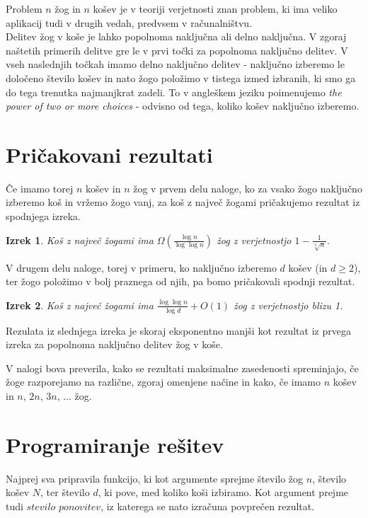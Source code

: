 \documentclass[a4paper, 11pt]{article}
\newtheorem{Izrek}{Izrek}
\begin{document}
Problem $n$ žog in $n$ košev je v teoriji verjetnosti znan problem, ki ima veliko aplikacij tudi v drugih vedah, predvsem v računalništvu.\\
Delitev žog v koše je lahko popolnoma naključna ali delno naključna.
V zgoraj naštetih primerih delitve gre le v prvi točki za popolnoma naključno delitev.
V vseh naslednjih točkah imamo delno naključno delitev - naključno izberemo le določeno število košev in nato žogo položimo v tistega izmed izbranih,
ki smo ga do tega trenutka najmanjkrat zadeli. To v angleškem jeziku poimenujemo \emph{the power of
two or more choices} - odvisno od tega, koliko košev naključno izberemo.

\section{Pričakovani rezultati}

Če imamo torej $n$ košev in $n$ žog v prvem delu naloge, ko za vsako žogo naključno izberemo koš in vržemo žogo vanj,
za koš z največ žogami pričakujemo rezultat iz spodnjega izreka.

\begin{Izrek}
    Koš z največ žogami ima $\Omega (\frac{\log{n}}{\log{\log{n}}})$ žog z verjetnostjo $1 - \frac{1}{\sqrt[3]{n}}$.
\end{Izrek}

V drugem delu naloge, torej v primeru, ko naključno izberemo $d$ košev (in $d \geq 2$), ter žogo položimo v bolj praznega od njih,
pa bomo pričakovali spodnji rezultat.

\begin{Izrek}
    Koš z največ žogami ima $\frac{\log {\log{n}}}{\log{d}} + O(1)$ žog z verjetnostjo blizu 1.
\end{Izrek}

Rezulata iz slednjega izreka je skoraj eksponentno manjši kot rezultat iz prvega izreka za popolnoma naključno delitev žog v koše.

V nalogi bova preverila, kako se rezultati maksimalne zasedenosti spreminjajo, če žoge razporejamo na različne, zgoraj omenjene načine
in kako, če imamo $n$ košev in $n$, $2n$, $3n$, ... žog.


\section{Programiranje rešitev}

Najprej sva pripravila funkcijo, ki kot argumente sprejme
število žog $n$, število košev $N$, ter število $d$, ki pove,
med koliko koši izbiramo. 
Kot argument prejme tudi $stevilo$ $ponovitev$, iz katerega se nato izračuna povprečen rezultat.
\end{document}
